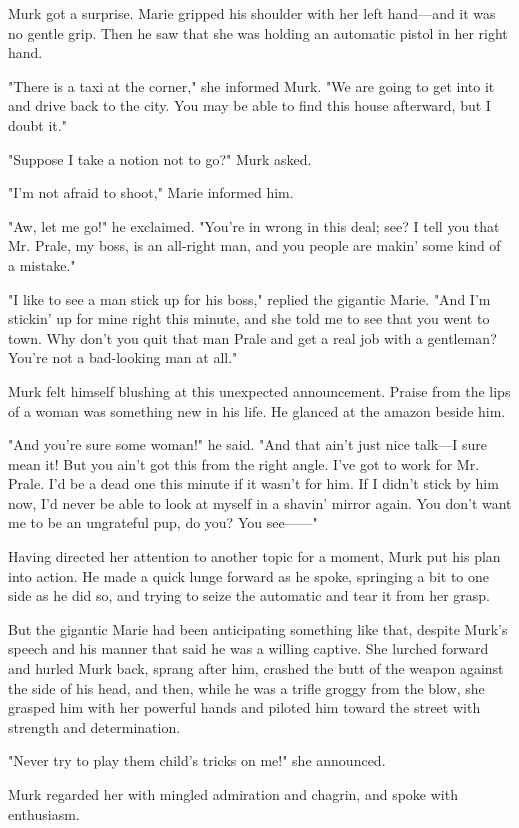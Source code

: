\documentclass{novel}
\begin{document}
Murk got a surprise. Marie gripped his shoulder with her left hand---and it was no gentle grip. Then he saw that she was holding an automatic pistol in her right hand.

"There is a taxi at the corner," she informed Murk. "We are going to get into it and drive back to the city. You may be able to find this house afterward, but I doubt it."

"Suppose I take a notion not to go?" Murk asked.

"I'm not afraid to shoot," Marie informed him.

"Aw, let me go!" he exclaimed. "You're in wrong in this deal; see? I tell you that Mr. Prale, my boss, is an all-right man, and you people are makin' some kind of a mistake."

"I like to see a man stick up for his boss," replied the gigantic Marie. "And I'm stickin' up for mine right this minute, and she told me to see that you went to town. Why don't you quit that man Prale and get a real job with a gentleman? You're not a bad-looking man at all."

Murk felt himself blushing at this unexpected announcement. Praise from the lips of a woman was something new in his life. He glanced at the amazon beside him.

"And you're sure some woman!" he said. "And that ain't just nice talk---I sure mean it! But you ain't got this from the right angle. I've got to work for Mr. Prale. I'd be a dead one this minute if it wasn't for him. If I didn't stick by him now, I'd never be able to look at myself in a shavin' mirror again. You don't want me to be an ungrateful pup, do you? You see------"

Having directed her attention to another topic for a moment, Murk put his plan into action. He made a quick lunge forward as he spoke, springing a bit to one side as he did so, and trying to seize the automatic and tear it from her grasp.

But the gigantic Marie had been anticipating something like that, despite Murk's speech and his manner that said he was a willing captive. She lurched forward and hurled Murk back, sprang after him, crashed the butt of the weapon against the side of his head, and then, while he was a trifle groggy from the blow, she grasped him with her powerful hands and piloted him toward the street with strength and determination.

"Never try to play them child's tricks on me!" she announced.

Murk regarded her with mingled admiration and chagrin, and spoke with enthusiasm.
\end{document}
